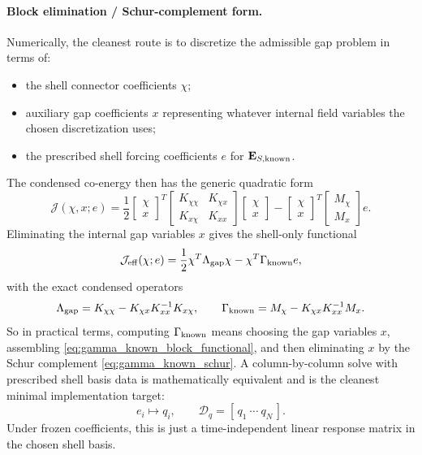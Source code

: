 \documentclass[11pt,a4paper]{article}
\begin{document}
\paragraph{Block elimination / Schur-complement form.}
Numerically, the cleanest route is to discretize the admissible gap problem in
terms of:
\begin{itemize}
\item the shell connector coefficients \(\chi\);
\item auxiliary gap coefficients \(x\) representing whatever internal field
variables the chosen discretization uses;
\item the prescribed shell forcing coefficients \(e\) for
\(\mathbf E_{S,\rm known}\).
\end{itemize}
The condensed co-energy then has the generic quadratic form
\begin{equation}
\mathcal J(\chi,x;e)
=
\frac12
\begin{bmatrix}
\chi\\ x
\end{bmatrix}^{\!T}
\begin{bmatrix}
K_{\chi\chi} & K_{\chi x}\\
K_{x\chi} & K_{xx}
\end{bmatrix}
\begin{bmatrix}
\chi\\ x
\end{bmatrix}
-
\begin{bmatrix}
\chi\\ x
\end{bmatrix}^{\!T}
\begin{bmatrix}
M_\chi\\ M_x
\end{bmatrix}
e.
\label{eq:gamma_known_block_functional}
\end{equation}
Eliminating the internal gap variables \(x\) gives the shell-only functional
\[
\mathcal J_{\rm eff}(\chi;e)
=
\frac12 \chi^T \Lambda_{\rm gap}\chi
- \chi^T \Gamma_{\rm known} e,
\]
with the exact condensed operators
\begin{equation}
\Lambda_{\rm gap}
=
K_{\chi\chi} - K_{\chi x}K_{xx}^{-1}K_{x\chi},
\qquad
\Gamma_{\rm known}
=
M_\chi - K_{\chi x}K_{xx}^{-1}M_x.
\label{eq:gamma_known_schur}
\end{equation}
So in practical terms, computing \(\Gamma_{\rm known}\) means choosing the gap
variables \(x\), assembling \eqref{eq:gamma_known_block_functional}, and then
eliminating \(x\) by the Schur complement \eqref{eq:gamma_known_schur}. A
column-by-column solve with prescribed shell basis data is mathematically
equivalent and is the cleanest minimal implementation target:
\[
e_i \mapsto q_i,
\qquad
\mathcal D_q = [\,q_1\ \cdots\ q_N\,].
\]
Under frozen coefficients, this is just a time-independent linear response
matrix in the chosen shell basis.
\end{document}
